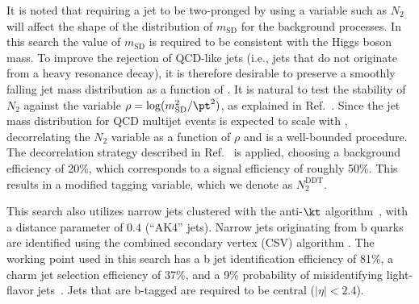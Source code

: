 

It is noted that requiring a jet to be two-pronged by using a variable
such as $N_2$ will affect the shape of the distribution of $m_\text{SD}$ for the
background processes. In this search the value of $m_\text{SD}$ is required to be consistent with the Higgs boson mass.
To improve the rejection of QCD-like jets (i.e., jets that
do not originate from a heavy resonance decay), it is therefore desirable to preserve a smoothly falling jet mass
distribution  as a function of \pt. It is natural to test
the stability of $N_2$ against the variable
$\rho=\log(m_{\text{SD}}^2/\pt^2)$, as explained in
Ref.~\cite{ddt}. Since the jet mass distribution for QCD multijet
events is expected to scale with \pt, decorrelating the $N_2$ variable
as a function of $\rho$ and \pt is a well-bounded procedure. The
decorrelation strategy described in Ref.~\cite{ddt} is applied,
choosing a background efficiency of 20\%, which corresponds to a
signal efficiency of roughly 50\%. This results in a modified tagging
variable, which we denote as $N_2^\text{DDT}$.

This search also utilizes narrow jets clustered
with the anti-$\kt$ algorithm~\cite{Cacciari:2008gp}, with a distance
parameter of $0.4$ (“AK4” jets). Narrow jets originating from b quarks are identified using the combined secondary vertex (CSV) algorithm \cite{Sirunyan:2017ezt, BTV-paper-2012-001}. The working point used in this search has a b jet identification efficiency of 81\%, a charm jet selection efficiency of 37\%, and a 9\% probability of misidentifying light-flavor jets~\cite{Sirunyan:2017ezt}. Jets that are b-tagged are required to be central ($|\eta|<2.4$).

